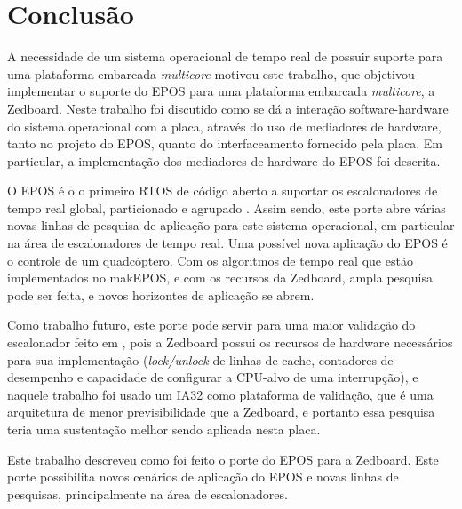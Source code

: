 \chapter{Conclusão}


A necessidade de um sistema operacional de tempo real de possuir suporte para uma plataforma embarcada \emph{multicore} motivou este trabalho, que objetivou implementar o suporte do EPOS para uma plataforma embarcada \emph{multicore}, a Zedboard.
Neste trabalho foi discutido como se dá a interação software-hardware do sistema operacional com a placa, através do uso de mediadores de hardware, tanto no projeto do EPOS, quanto do interfaceamento fornecido pela placa. Em particular, a implementação dos mediadores de hardware do EPOS foi descrita.


O EPOS é o o primeiro RTOS de código aberto a suportar os escalonadores de tempo real global, particionado e agrupado \cite{gio}. Assim sendo, este porte abre várias novas linhas de pesquisa de aplicação para este sistema operacional, em particular na área de escalonadores de tempo real.
Uma possível nova aplicação do EPOS é o controle de um quadcóptero. Com os algoritmos de tempo real que estão implementados no makEPOS, e com os recursos da Zedboard, ampla pesquisa pode ser feita, e novos horizontes de aplicação se abrem.

Como trabalho futuro, este porte pode servir para uma maior validação do escalonador feito em \cite{gio}, pois a Zedboard possui os recursos de hardware necessários para sua implementação (\emph{lock/unlock} de linhas de cache, contadores de desempenho e capacidade de configurar a CPU-alvo de uma interrupção), e naquele trabalho foi usado um IA32 como plataforma de validação, que é uma arquitetura de menor previsibilidade que a Zedboard, e portanto essa pesquisa teria uma sustentação melhor sendo aplicada nesta placa.



Este trabalho descreveu como foi feito o porte do EPOS para a Zedboard. Este porte possibilita novos cenários de aplicação do EPOS e novas linhas de pesquisas, principalmente na área de escalonadores.
